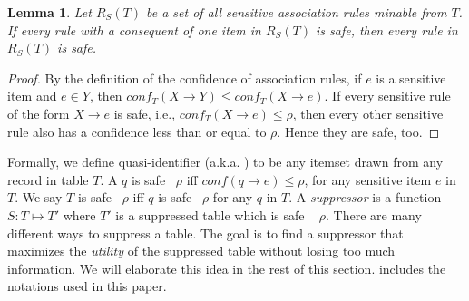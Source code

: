 \newtheorem{lemma}{Lemma}

\begin{lemma}

Let $R_S(T)$ be a set of all sensitive association rules minable from $T$.
If every rule with a consequent of one item in $R_S(T)$ is safe,
then every rule in $R_S(T)$ is safe. 
\end{lemma}
\begin{proof}
By the definition of the confidence of association rules,
if $e$ is a sensitive item and $e \in Y$, then $conf_T(X \rightarrow Y) \le
conf_T(X \rightarrow e)$. If every sensitive rule of the form $X \rightarrow e$ is safe,
i.e., $conf_T(X \rightarrow e) \le \rho$, then every other sensitive rule also has a confidence less than or equal to $\rho$. Hence they are safe, too.
\end{proof}


Formally, we define {quasi-identifier} (a.k.a. \qid) to be any itemset
 drawn from any record in table $T$. A \qid $q$ is safe \wrt~$\rho$ iff $conf(q \rightarrow e)\leq\rho$, for any sensitive item $e$ in $T$.
We say $T$ is safe \wrt~$\rho$ iff $q$ is safe \wrt~$\rho$ for any \qid $q$ in $T$.
A \emph{suppressor} is a function $S : T \mapsto T'$ where $T'$ is a suppressed table which is safe \wrt~ $\rho$.
There are many different ways to suppress a table. The goal
is to find a suppressor that maximizes the {\em utility} of the suppressed
table without losing too much information. We will elaborate this idea
in the rest of this section. 
 includes the
notations used in this paper.

